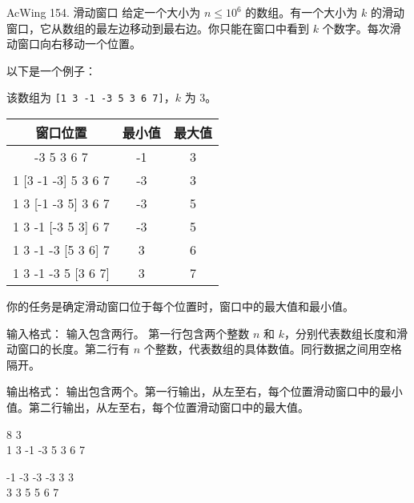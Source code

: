 \begin{titledbox}{AcWing 154. 滑动窗口}
    给定一个大小为 $n \le 10^6$ 的数组。有一个大小为 $k$ 的滑动窗口，它从数组的最左边移动到最右边。你只能在窗口中看到 $k$ 个数字。每次滑动窗口向右移动一个位置。

    以下是一个例子：

    该数组为 \lstinline{[1 3 -1 -3 5 3 6 7]}，$k$ 为 $3$。

    \begin{tabular}{|c|c|c|}
        \hline
        窗口位置           & 最小值 & 最大值 \\ \hline
        [1 3  -1] -3 5 3 6 7  & -1  & 3   \\ \hline
        1 [3  -1  -3] 5 3 6 7 & -3  & 3   \\ \hline
        1 3 [-1  -3 5] 3 6 7 & -3  & 5   \\ \hline
        1 3  -1 [-3 5 3] 6 7 & -3  & 5   \\ \hline
        1 3  -1  -3 [5 3 6] 7 & 3   & 6   \\ \hline
        1 3  -1  -3 5 [3 6 7]  & 3   & 7   \\ \hline
    \end{tabular}

    你的任务是确定滑动窗口位于每个位置时，窗口中的最大值和最小值。

    输入格式：
    输入包含两行。 第一行包含两个整数 $n$ 和 $k$，分别代表数组长度和滑动窗口的长度。第二行有 $n$ 个整数，代表数组的具体数值。同行数据之间用空格隔开。

    输出格式：
    输出包含两个。第一行输出，从左至右，每个位置滑动窗口中的最小值。第二行输出，从左至右，每个位置滑动窗口中的最大值。

    \begin{inputblock}
        8 3 \\
        1 3 -1 -3 5 3 6 7
    \end{inputblock}
    \begin{outputblock}
        -1 -3 -3 -3 3 3 \\
        3 3 5 5 6 7
    \end{outputblock}

\end{titledbox}

